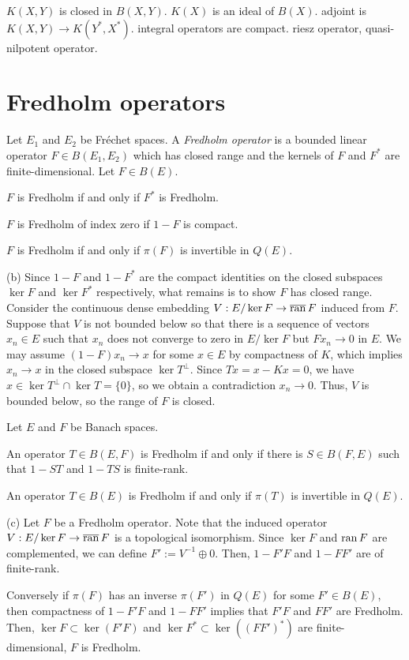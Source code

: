 \documentclass{../../large}
\begin{document}
$K(X,Y)$ is closed in $B(X,Y)$.
$K(X)$ is an ideal of $B(X)$.
adjoint is $K(X,Y)\to K(Y^*,X^*)$.
integral operators are compact.
riesz operator, quasi-nilpotent operator.




\section{Fredholm operators}

\begin{prb}
Let $E_1$ and $E_2$ be Fr\'echet spaces.
A \emph{Fredholm operator} is a bounded linear operator $F\in B(E_1,E_2)$ which has closed range and the kernels of $F$ and $F^*$ are finite-dimensional.
Let $F\in B(E)$.
\begin{parts}
\item $F$ is Fredholm if and only if $F^*$ is Fredholm.
\item $F$ is Fredholm of index zero if $1-F$ is compact.
\item $F$ is Fredholm if and only if $\pi(F)$ is invertible in $Q(E)$.
\end{parts}
\end{prb}
\begin{pf}
(b)
Since $1-F$ and $1-F^*$ are the compact identities on the closed subspaces $\ker F$ and $\ker F^*$ respectively, what remains is to show $F$ has closed range.
Consider the continuous dense embedding $V:E/\ker F\to\overline{\operatorname{ran}}\,F$ induced from $F$.
Suppose that $V$ is not bounded below so that there is a sequence of vectors $x_n\in E$ such that $x_n$ does not converge to zero in $E/\ker F$ but $Fx_n\to0$ in $E$.
We may assume $(1-F)x_n\to x$ for some $x\in E$ by compactness of $K$, which implies $x_n\to x$ in the closed subspace $\ker T^\perp$.
Since $Tx=x-Kx=0$, we have $x\in\ker T^\perp\cap\ker T=\{0\}$, so we obtain a contradiction $x_n\to0$.
Thus, $V$ is bounded below, so the range of $F$ is closed.
\end{pf}

\begin{prb}
Let $E$ and $F$ be Banach spaces.
\begin{parts}
\item An operator $T\in B(E,F)$ is Fredholm if and only if there is $S\in B(F,E)$ such that $1-ST$ and $1-TS$ is finite-rank.
\item An operator $T\in B(E)$ is Fredholm if and only if $\pi(T)$ is invertible in $Q(E)$.
\end{parts}
\end{prb}
\begin{pf}
(c)
Let $F$ be a Fredholm operator.
Note that the induced operator $V:E/\ker F\to\overline{\operatorname{ran}}\,F$ is a topological isomorphism.
Since $\ker F$ and $\operatorname{ran} F$ are complemented, we can define $F':=V^{-1}\oplus0$.
Then, $1-F'F$ and $1-FF'$ are of finite-rank.

Conversely if $\pi(F)$ has an inverse $\pi(F')$ in $Q(E)$ for some $F'\in B(E)$, then compactness of $1-F'F$ and $1-FF'$ implies that $F'F$ and $FF'$ are Fredholm.
Then, $\ker F\subset\ker(F'F)$ and $\ker F^*\subset\ker((FF')^*)$ are finite-dimensional, $F$ is Fredholm.
\end{pf}
\end{document}
